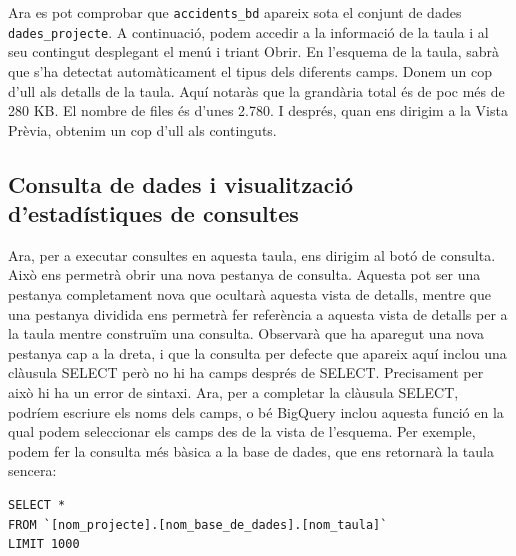 \documentclass[12pt,longbibliography]{article}
\theoremstyle{definition}
\theoremstyle{remark}
\begin{document}
\vspace{2mm}

Ara es pot comprobar que \verb|accidents_bd| apareix sota el conjunt de dades \verb|dades_projecte|. A continuació, podem accedir a la informació de la taula i al seu contingut desplegant el menú i triant Obrir. En l'esquema de la taula, sabrà que s'ha detectat automàticament el tipus dels diferents camps. Donem un cop d'ull als detalls de la taula. Aquí notaràs que la grandària total és de poc més de 280 KB. El nombre de files és d'unes 2.780. I després, quan ens dirigim a la Vista Prèvia, obtenim un cop d'ull als continguts. 

\subsection{Consulta de dades i visualització d'estadístiques de consultes}

Ara, per a executar consultes en aquesta taula, ens dirigim al botó de consulta. Això ens permetrà obrir una nova pestanya de consulta. Aquesta pot ser una pestanya completament nova que ocultarà aquesta vista de detalls, mentre que una pestanya dividida ens permetrà fer referència a aquesta vista de detalls per a la taula mentre construïm una consulta. Observarà que ha aparegut una nova pestanya cap a la dreta, i que la consulta per defecte que apareix aquí inclou una clàusula SELECT però no hi ha camps després de SELECT. Precisament per això hi ha un error de sintaxi. Ara, per a completar la clàusula SELECT, podríem escriure els noms dels camps, o bé BigQuery inclou aquesta funció en la qual podem seleccionar els camps des de la vista de l'esquema. Per exemple, podem fer la consulta més bàsica a la base de dades, que ens retornarà la taula sencera:

\begin{verbatim}
SELECT *
FROM `[nom_projecte].[nom_base_de_dades].[nom_taula]`
LIMIT 1000
\end{verbatim}

\vspace{2mm}
\end{document}
